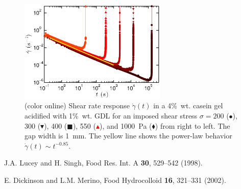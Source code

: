 \documentclass[twocolumn,superscriptaddress,showpacs,preprintnumbers,amsmath,amssymb,prl]{revtex4}
\newcommand\gp{\dot\gamma}
\begin{document}
\begin{figure}[h]
\centering
\includegraphics[width=7cm,clip]{SuppFig2.eps}
\caption{(color online) Shear rate response $\gp(t)$ in a 4\%~wt. casein gel acidified with 1\%~wt. GDL for an imposed shear stress $\sigma=200$ (\textcolor{red!25!black}{$\bullet$}), 300 (\textcolor{red!50!black}{$\blacktriangledown$}), 400 (\textcolor{red!75!black}{$\blacksquare$}), 550 (\textcolor{red}{$\blacktriangle$}), and 1000~Pa (\textcolor{orange!50!red}{$\blacklozenge$}) from right to left. The gap width is 1~mm. The yellow line shows the power-law behavior $\gp(t)\sim t^{-0.85}$.
\label{suppfig2}}
\end{figure} 

\begin{thebibliography}{}

 J.A. Lucey and H. Singh, Food Res. Int. A {\bf 30}, 529--542 (1998).

 E. Dickinson and L.M. Merino, Food Hydrocolloid {\bf 16}, 321--331 (2002).

\end{thebibliography}
\end{document}
